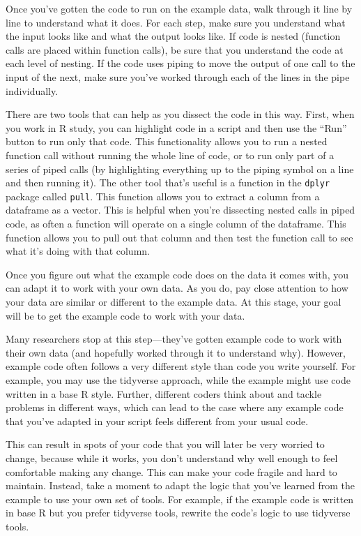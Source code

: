 \documentclass[]{tufte-book}
\begin{document}
Once you've gotten the code to run on the example data, walk through it line
by line to understand what it does. For each step, make sure you understand
what the input looks like and what the output looks like. If code is nested
(function calls are placed within function calls), be sure that you understand
the code at each level of nesting. If the code uses piping to move the output
of one call to the input of the next, make sure you've worked through each
of the lines in the pipe individually.

There are two tools that can help as you dissect the code in this way. First,
when you work in R study, you can highlight code in a script and then use the
``Run'' button to run only that code. This functionality allows you to run a
nested function call without running the whole line of code, or to run only part
of a series of piped calls (by highlighting everything up to the piping symbol
on a line and then running it). The other tool that's useful is a function in
the \texttt{dplyr} package called \texttt{pull}. This function allows you to extract a column
from a dataframe as a vector. This is helpful when you're dissecting nested
calls in piped code, as often a function will operate on a single column of the
dataframe. This function allows you to pull out that column and then test the
function call to see what it's doing with that column.

Once you figure out what the example code does on the data it comes with, you
can adapt it to work with your own data. As you do, pay close attention to
how your data are similar or different to the example data. At this stage, your
goal will be to get the example code to work with your data.

Many researchers stop at this step---they've gotten example code to work with
their own data (and hopefully worked through it to understand why). However,
example code often follows a very different style than code you write yourself.
For example, you may use the tidyverse approach, while the example might use
code written in a base R style. Further, different coders think about and
tackle problems in different ways, which can lead to the case where any
example code that you've adapted in your script feels different from your usual
code.

This can result in spots of your code that you will later be very worried to
change, because while it works, you don't understand why well enough to feel
comfortable making any change. This can make your code fragile and hard to
maintain. Instead, take a moment to adapt the logic that you've learned from
the example to use your own set of tools. For example, if the example code is
written in base R but you prefer tidyverse tools, rewrite the code's logic
to use tidyverse tools.
\end{document}
